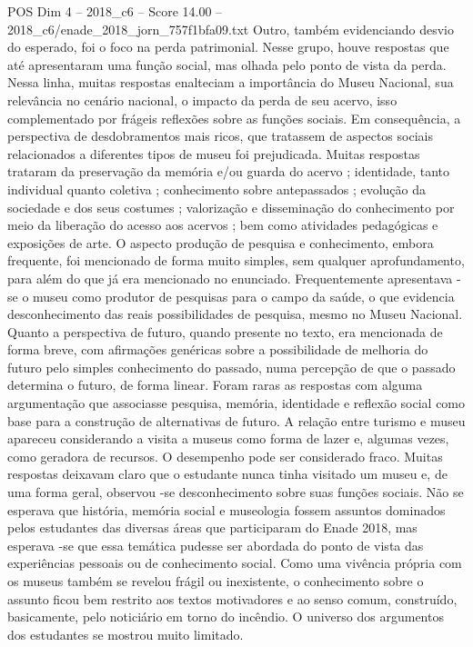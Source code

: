 \begin{textsample}{POS Dim 4 – 2018\_c6 – Score 14.00 – 2018\_c6/enade\_2018\_jorn\_757f1bfa09.txt}
Outro, também evidenciando desvio do esperado, foi o foco na perda patrimonial.
Nesse grupo, houve respostas que até apresentaram uma função social, mas olhada pelo ponto de vista da perda.
Nessa linha, muitas respostas enalteciam a importância do Museu Nacional, sua relevância no cenário nacional, o impacto da perda de seu acervo, isso complementado por frágeis reflexões sobre as funções sociais.
Em consequência, a perspectiva de desdobramentos mais ricos, que tratassem de aspectos sociais relacionados a diferentes tipos de museu foi prejudicada.
Muitas respostas trataram da preservação da memória e/ou guarda do acervo ; identidade, tanto individual quanto coletiva ; conhecimento sobre antepassados ; evolução da sociedade e dos seus costumes ; valorização e disseminação do conhecimento por meio da liberação do acesso aos acervos ; bem como atividades pedagógicas e exposições de arte.
O aspecto produção de pesquisa e conhecimento, embora frequente, foi mencionado de forma muito simples, sem qualquer aprofundamento, para além do que já era mencionado no enunciado.
Frequentemente apresentava -se o museu como produtor de pesquisas para o campo da saúde, o que evidencia desconhecimento das reais possibilidades de pesquisa, mesmo no Museu Nacional.
Quanto a perspectiva de futuro, quando presente no texto, era mencionada de forma breve, com afirmações genéricas sobre a possibilidade de melhoria do futuro pelo simples conhecimento do passado, numa percepção de que o passado determina o futuro, de forma linear.
Foram raras as respostas com alguma argumentação que associasse pesquisa, memória, identidade e reflexão social como base para a construção de alternativas de futuro.
A relação entre turismo e museu apareceu considerando a visita a museus como forma de lazer e, algumas vezes, como geradora de recursos.
O desempenho pode ser considerado fraco.
Muitas respostas deixavam claro que o estudante nunca tinha visitado um museu e, de uma forma geral, observou -se desconhecimento sobre suas funções sociais.
Não se esperava que história, memória social e museologia fossem assuntos dominados pelos estudantes das diversas áreas que participaram do Enade 2018, mas esperava -se que essa temática pudesse ser abordada do ponto de vista das experiências pessoais ou de conhecimento social.
Como uma vivência própria com os museus também se revelou frágil ou inexistente, o conhecimento sobre o assunto ficou bem restrito aos textos motivadores e ao senso comum, construído, basicamente, pelo noticiário em torno do incêndio.
O universo dos argumentos dos estudantes se mostrou muito limitado.

\end{textsample}
